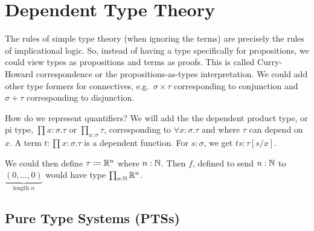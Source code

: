 \section{Dependent Type Theory}


The rules of simple type theory (when ignoring the terms) are precisely the rules of implicational logic. 
So, instead of having a type specifically for propositions, we could view types as propositions and terms as proofs. 
This is called \alert{Curry-Howard correspondence} or the \alert{propositions-as-types interpretation}.
We could add other type formers for connectives, e.g.\ $\sigma \times \tau$ corresponding to conjunction and $\sigma + \tau$ corresponding to disjunction.

How do we represent quantifiers?
We will add the the \alert{dependent product type}, or \alert{pi type}, $\prod x : \sigma. \tau$ or $\prod_{x : \sigma} \tau$, corresponding to $\forall x : \sigma. \tau$ and where $\tau$ can depend on $x$.
A term $t : \prod x : \sigma. \tau$ is a dependent function. 
For $s : \sigma$, we get $ts : \tau[s/x]$.

\begin{example}
    We could then define $\tau \coloneq \mathbb{R}^n$ where $n : \mathbb{N}$. 
    Then $f$, defined to send $n : \mathbb{N}$ to $\underbrace{(0, \dots, 0)}_{\text{length }n}$ would have type $\prod_{n : \mathbb{N}} \mathbb{R}^n$.
\end{example}

\subsection{Pure Type Systems (PTSs)}


